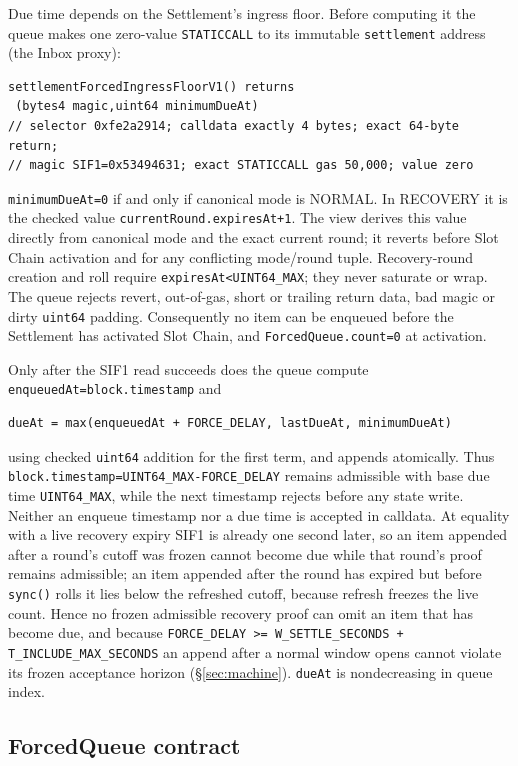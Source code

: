 \documentclass[a4paper,11pt]{article}
\newcommand{\code}[1]{\nolinkurl{#1}}
\begin{document}
Due time depends on the Settlement's ingress floor.  Before computing it the
queue makes one zero-value \code{STATICCALL} to its immutable
\code{settlement} address (the Inbox proxy):
\begin{verbatim}
settlementForcedIngressFloorV1() returns
 (bytes4 magic,uint64 minimumDueAt)
// selector 0xfe2a2914; calldata exactly 4 bytes; exact 64-byte return;
// magic SIF1=0x53494631; exact STATICCALL gas 50,000; value zero
\end{verbatim}
\code{minimumDueAt=0} if and only if canonical mode is NORMAL.  In RECOVERY
it is the checked value \code{currentRound.expiresAt+1}.  The view derives
this value directly from canonical mode and the exact current round; it
reverts before Slot Chain activation and for any conflicting mode/round
tuple.  Recovery-round creation and roll require \code{expiresAt<UINT64_MAX};
they never saturate or wrap.  The queue rejects revert, out-of-gas, short or
trailing return data, bad magic or dirty \code{uint64} padding.
Consequently no item can be enqueued before the Settlement has activated
Slot Chain, and \code{ForcedQueue.count=0} at activation.

Only after the SIF1 read succeeds does the queue compute
\code{enqueuedAt=block.timestamp} and
\begin{verbatim}
dueAt = max(enqueuedAt + FORCE_DELAY, lastDueAt, minimumDueAt)
\end{verbatim}
using checked \code{uint64} addition for the first term, and appends
atomically.  Thus \code{block.timestamp=UINT64_MAX-FORCE_DELAY} remains
admissible with base due time \code{UINT64_MAX}, while the next timestamp
rejects before any state write.  Neither an enqueue timestamp nor a due time
is accepted in calldata.  At equality with a live recovery expiry SIF1 is
already one second later, so an item appended after a round's cutoff was
frozen cannot become due while that round's proof remains admissible; an
item appended after the round has expired but before \code{sync()} rolls it
lies below the refreshed cutoff, because refresh freezes the live count.
Hence no frozen admissible recovery proof can omit an item that has become
due, and because
\code{FORCE_DELAY >= W_SETTLE_SECONDS + T_INCLUDE_MAX_SECONDS} an append
after a normal window opens cannot violate its frozen acceptance horizon
(\S\ref{sec:machine}).  \code{dueAt} is nondecreasing in queue index.

\subsection{ForcedQueue contract}\label{sec:forced-queue-contract}
\end{document}
